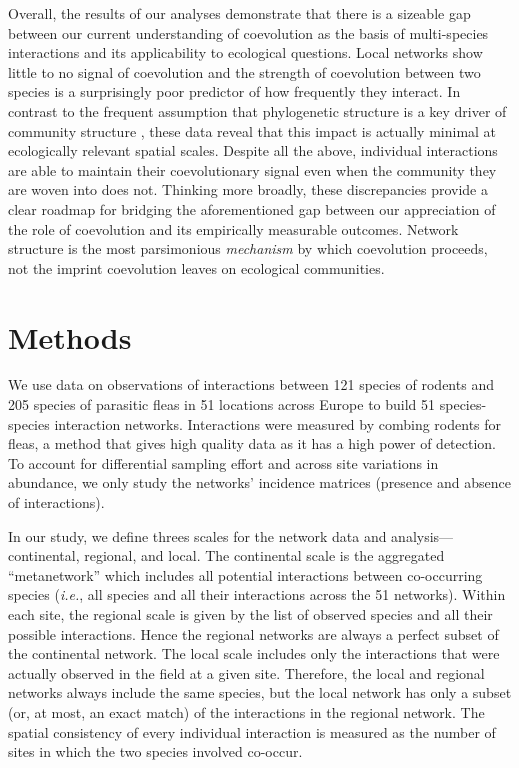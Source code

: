 Overall, the results of our analyses demonstrate that there is a
sizeable gap between our current understanding of coevolution as the
basis of multi-species interactions and its applicability to ecological
questions. Local networks show little to no signal of coevolution and
the strength of coevolution between two species is a surprisingly poor
predictor of how frequently they interact. In contrast to the frequent
assumption that phylogenetic structure is a key driver of community
structure \citep{cave09}, these data reveal that this impact is actually
minimal at ecologically relevant spatial scales. Despite all the above,
individual interactions are able to maintain their coevolutionary signal
even when the community they are woven into does not. Thinking more
broadly, these discrepancies provide a clear roadmap for bridging the
aforementioned gap between our appreciation of the role of coevolution
and its empirically measurable outcomes. Network structure is the most
parsimonious \emph{mechanism} by which coevolution proceeds, not the
imprint coevolution leaves on ecological communities.

\section{Methods}\label{methods}

We use data on observations of interactions between 121 species of
rodents and 205 species of parasitic fleas in 51 locations across Europe
\citep{kras12b} to build 51 species-species interaction networks.
Interactions were measured by combing rodents for fleas, a method that
gives high quality data as it has a high power of detection. To account
for differential sampling effort and across site variations in
abundance, we only study the networks' incidence matrices (presence and
absence of interactions).

In our study, we define threes scales for the network data and
analysis---continental, regional, and local. The continental scale is
the aggregated ``metanetwork'' which includes all potential interactions
between co-occurring species \citep{pois12c} (\emph{i.e.}, all species
and all their interactions across the 51 networks). Within each site,
the regional scale is given by the list of observed species and all
their possible interactions. Hence the regional networks are always a
perfect subset of the continental network. The local scale includes only
the interactions that were actually observed in the field at a given
site. Therefore, the local and regional networks always include the same
species, but the local network has only a subset (or, at most, an exact
match) of the interactions in the regional network. The spatial
consistency of every individual interaction is measured as the number of
sites in which the two species involved co-occur.

